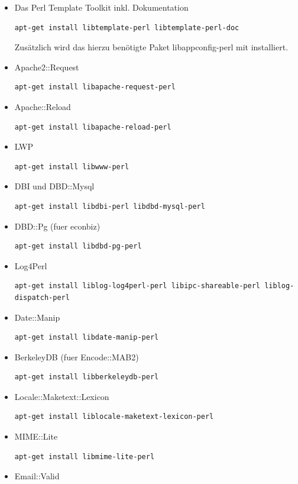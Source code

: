 \documentclass[11pt, twoside, a4paper, BCOR8mm, DIV12, bibtotoc,idxtotoc]{scrbook}
\begin{document}
\begin{itemize}
\item Das Perl Template Toolkit inkl. Dokumentation
\begin{verbatim}
apt-get install libtemplate-perl libtemplate-perl-doc
\end{verbatim}
  Zusätzlich wird das hierzu benötigte Paket libappconfig-perl mit
  installiert.
\item Apache2::Request
\begin{verbatim}
apt-get install libapache-request-perl
\end{verbatim}
\item Apache::Reload
\begin{verbatim}
apt-get install libapache-reload-perl
\end{verbatim}
\item LWP
\begin{verbatim}
apt-get install libwww-perl
\end{verbatim}
\item DBI und DBD::Mysql
\begin{verbatim}
apt-get install libdbi-perl libdbd-mysql-perl
\end{verbatim}
\item DBD::Pg (fuer econbiz)
\begin{verbatim}
apt-get install libdbd-pg-perl
\end{verbatim}
\item Log4Perl
\begin{verbatim}
apt-get install liblog-log4perl-perl libipc-shareable-perl liblog-dispatch-perl
\end{verbatim}
\item Date::Manip
\begin{verbatim}
apt-get install libdate-manip-perl
\end{verbatim}
\item BerkeleyDB (fuer Encode::MAB2)
\begin{verbatim}
apt-get install libberkeleydb-perl
\end{verbatim}
\item Locale::Maketext::Lexicon
\begin{verbatim}
apt-get install liblocale-maketext-lexicon-perl
\end{verbatim}
\item MIME::Lite
\begin{verbatim}
apt-get install libmime-lite-perl
\end{verbatim}
\item Email::Valid

\end{itemize}
\end{document}
